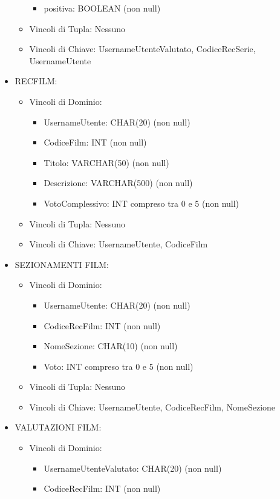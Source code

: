 \documentclass[a4paper,12pt]{report}
\begin{document}
\begin{itemize}
\begin{itemize}
\begin{itemize}
			\item positiva: BOOLEAN (non null)
		\end{itemize}
		\item Vincoli di Tupla: Nessuno
		\item Vincoli di Chiave: UsernameUtenteValutato, CodiceRecSerie, UsernameUtente
	\end{itemize}
	\item RECFILM:
	\begin{itemize}
		\item Vincoli di Dominio:
		\begin{itemize}
			\item UsernameUtente: CHAR(20) (non null)
			\item CodiceFilm: INT (non null)
			\item Titolo: VARCHAR(50) (non null)
			\item Descrizione: VARCHAR(500) (non null)
			\item VotoComplessivo: INT compreso tra 0 e 5 (non null)
		\end{itemize}
		\item Vincoli di Tupla: Nessuno
		\item Vincoli di Chiave: UsernameUtente, CodiceFilm
	\end{itemize}
	\item SEZIONAMENTI FILM:
	\begin{itemize}
		\item Vincoli di Dominio:
		\begin{itemize}
			\item UsernameUtente: CHAR(20) (non null)
			\item CodiceRecFilm: INT (non null)
			\item NomeSezione: CHAR(10) (non null)
			\item Voto: INT compreso tra 0 e 5 (non null)
		\end{itemize}
		\item Vincoli di Tupla: Nessuno
		\item Vincoli di Chiave: UsernameUtente, CodiceRecFilm, NomeSezione
	\end{itemize}
	\item VALUTAZIONI FILM:
	\begin{itemize}
		\item Vincoli di Dominio:
		\begin{itemize}
			\item UsernameUtenteValutato: CHAR(20) (non null)
			\item CodiceRecFilm: INT (non null)

\end{itemize}
\end{itemize}
\end{itemize}
\end{document}
